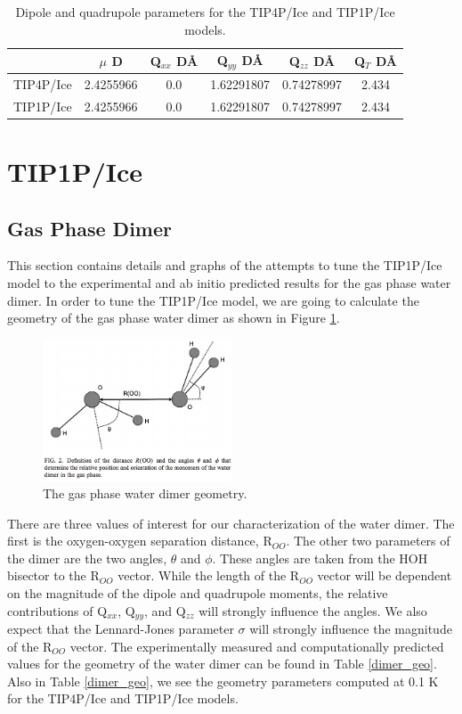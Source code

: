 \documentclass[aps, jcp, prl, reprint, groupedaddress, superscriptaddress, twocolumn]{revtex4-1}
\begin{document}
\begin{table}[h!]
\begin{tabular} {|c|c|c|c|c|c|}
\hline
& $\mu$ D & Q$_{xx}$ D\AA & Q$_{yy}$ D\AA & Q$_{zz}$ D\AA & Q$_T$ D\AA \\
\hline
TIP4P/Ice & 2.4255966 & 0.0 & 1.62291807 & 0.74278997 & 2.434 \\
TIP1P/Ice & 2.4255966 &0.0 & 1.62291807 & 0.74278997 &2.434 \\
\hline
\end{tabular}
\caption{Dipole and quadrupole parameters for the TIP4P/Ice and TIP1P/Ice models.}
\label{DQ_Params}
\end{table}


\section{TIP1P/Ice}
\subsection{Gas Phase Dimer}
This section contains details and graphs of the attempts to tune the TIP1P/Ice
model to the experimental and ab initio predicted results for the gas phase
water dimer. In order to tune the TIP1P/Ice model, we are going to calculate 
the geometry of the gas phase water dimer as shown in Figure 
\ref{fig:dimer}\cite{Yu04}.

\begin{figure}[h!]
\includegraphics[width = 0.5\textwidth]{dimer.pdf}
\caption{\label{fig:dimer} The gas phase water dimer geometry.}
\end{figure}

There are three values of interest for our characterization of the water dimer.
The first is the oxygen-oxygen separation distance, R$_{OO}$. The other two
parameters of the dimer are the two angles, $\theta$ and $\phi$. These angles
are taken from the HOH bisector to the R$_{OO}$ vector. While the length
of the R$_{OO}$ vector will be dependent on the magnitude of the dipole and 
quadrupole moments, the relative contributions of Q$_{xx}$, Q$_{yy}$, and
Q$_{zz}$ will strongly influence the angles. We also expect that the 
Lennard-Jones parameter $\sigma$ will strongly influence the magnitude of
the R$_{OO}$ vector.
The experimentally measured and computationally predicted values for the 
geometry of the water
dimer can be found in Table \ref{dimer_geo}. Also in Table \ref{dimer_geo}, we
see the geometry parameters computed at 0.1 K for the TIP4P/Ice and TIP1P/Ice
models.
\end{document}
